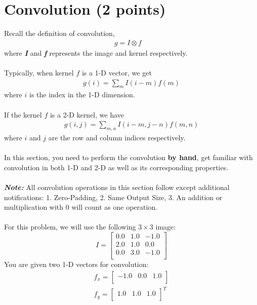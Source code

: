 \section{Convolution (2 points)}
Recall the definition of convolution, 
\begin{align}
g = I \otimes f &\  
\end{align}
where \emph{\textbf{I}} and \emph{\textbf{f}} represents the image and kernel respectively. \\
\\Typically, when kernel $f$ is a 1-D vector, we get
\begin{align}
g(i) = \sum_{m}I(i - m)f(m) 
\end{align}
where $i$ is the index in the 1-D dimension.\\
\\If the kernel $f$ is a 2-D kernel, we have
\begin{align}
g(i, j) = \sum_{m, n}I(i - m, j - n)f(m, n) 
\end{align}
where $i$ and $j$ are the row and column indices respectively.\\
\\In this section, you need to perform the convolution \textbf{by hand}, get familiar with convolution in both 1-D and 2-D as well as its corresponding properties. \\
\\ \emph{\textbf{Note:}} All convolution operations in this section follow except additional notifications: 1. Zero-Padding, 2. Same Output Size, 3. An addition or multiplication with 0 will count as one operation.\\
\\For this problem, we will use the following $3 \times 3$ image:
\begin{equation}
I = 
	\begin{bmatrix}
	0.0 & 1.0 & -1.0 \\
    2.0 & 1.0 & 0.0 \\ 
    0.0 & 3.0 & -1.0 \\
	\end{bmatrix}
\end{equation}
You are given two 1-D vectors for convolution:
\begin{align}
f_{x} = 	
	\begin{bmatrix}
	-1.0 & 0.0 & 1.0 \\
	\end{bmatrix}\\
f_{y} = 	
	\begin{bmatrix}
	1.0 & 1.0 & 1.0 \\
	\end{bmatrix}^T
\end{align}\\
